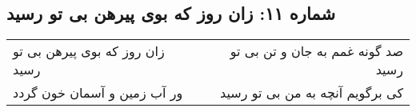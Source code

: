 \begin{center}
\section*{شماره ۱۱: زان روز که بوی پیرهن بی تو رسید}
\label{sec:011}
\begin{longtable}{l p{0.5cm} r}
زان روز که بوی پیرهن بی تو رسید
&&
صد گونه غمم به جان و تن بی تو رسید
\\
ور آب زمین و آسمان خون گردد
&&
کی برگویم آنچه به من بی تو رسید
\\
\end{longtable}
\end{center}
